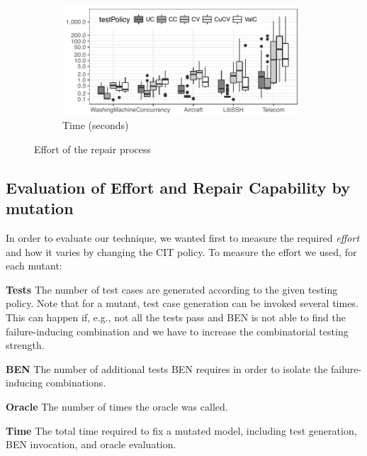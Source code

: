 \begin{tikzborder}{\cite{Gargantini16:validation}}
\begin{tikzborder}{\cite{gargantini_combinatorial_2017}}
\begin{figure}
\begin{subfigure}[b]{0.49\textwidth}
		\centering
		\includegraphics[width=0.98\textwidth]{data/time.pdf}
		\caption{Time (seconds)}\label{fig:time}
	\end{subfigure}
	\caption{Effort of the repair process}\label{fig:repaireffort}
\end{figure}

\subsection*{Evaluation of Effort and Repair Capability by mutation} 

\bb In order to evaluate our technique,  we wanted first to measure the required \emph{effort} and how it varies by changing the CIT policy. To measure the effort we used, for each mutant:

\begin{compactdesc}
	\newcommand{\Time}{\textbf{Time}\xspace}
	\newcommand{\Ben}{\textbf{BEN}\xspace}
	\newcommand{\Tests}{\textbf{Tests}\xspace}
	\newcommand{\Oracle}{\textbf{Oracle}\xspace}
	\item[\Tests] The number of test cases are generated according to the given testing policy. Note that for a mutant, test case generation can be invoked several times.
	\noindent This can happen if, e.g., not all the tests pass and BEN is not able to find the failure-inducing combination and we have to increase the combinatorial testing strength.
	
	\item[\Ben] The number of additional tests BEN requires in order to isolate the failure-inducing combinations. 
	
	\item[\Oracle] The number of times the oracle was called.
	
	\item[\Time] The total time required to fix a mutated model, including test generation, BEN invocation, and oracle evaluation. 
\end{compactdesc}


\end{tikzborder}
\end{tikzborder}
